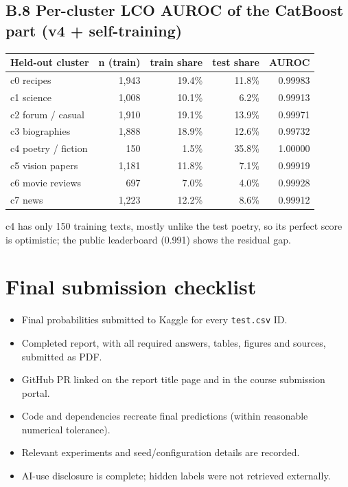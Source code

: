 \documentclass[11pt,letterpaper]{article}
\newcommand{\smallnote}[1]{{\small\color{muted}#1}}
\begin{document}
\subsection*{B.8 Per-cluster LCO AUROC of the CatBoost part (v4 + self-training)}
\begin{tabularx}{\linewidth}{@{}Yrrrr@{}}\toprule Held-out cluster & n (train) & train share & test share & AUROC \\ \midrule
c0 recipes & 1,943 & 19.4\% & 11.8\% & 0.99983 \\
c1 science & 1,008 & 10.1\% & 6.2\% & 0.99913 \\
c2 forum / casual & 1,910 & 19.1\% & 13.9\% & 0.99971 \\
c3 biographies & 1,888 & 18.9\% & 12.6\% & 0.99732 \\
c4 poetry / fiction & 150 & 1.5\% & 35.8\% & 1.00000 \\
c5 vision papers & 1,181 & 11.8\% & 7.1\% & 0.99919 \\
c6 movie reviews & 697 & 7.0\% & 4.0\% & 0.99928 \\
c7 news & 1,223 & 12.2\% & 8.6\% & 0.99912 \\
\bottomrule\end{tabularx}
\smallnote{c4 has only 150 training texts, mostly unlike the test poetry, so its perfect score is optimistic; the public leaderboard (0.991) shows the residual gap.}
\normalsize

\newpage
\section*{Final submission checklist}
\begin{itemize}[label=$\square$]
\item Final probabilities submitted to Kaggle for every \texttt{test.csv} ID.
\item Completed report, with all required answers, tables, figures and sources, submitted as PDF.
\item GitHub PR linked on the report title page and in the course submission portal.
\item Code and dependencies recreate final predictions (within reasonable numerical tolerance).
\item Relevant experiments and seed/configuration details are recorded.
\item AI-use disclosure is complete; hidden labels were not retrieved externally.
\end{itemize}
\end{document}
